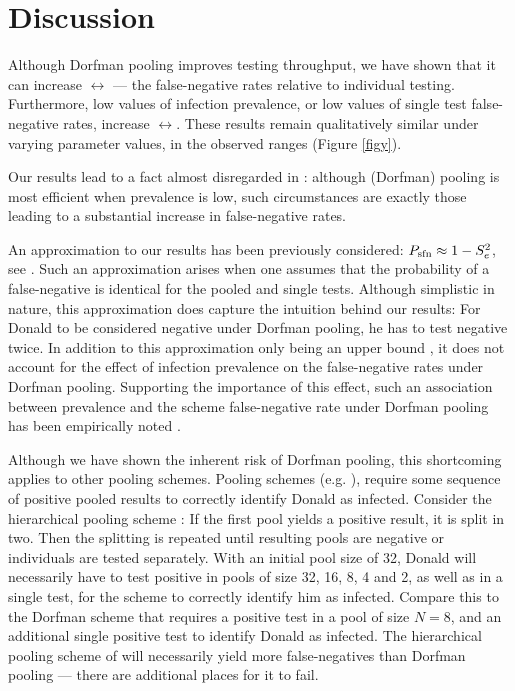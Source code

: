 \documentclass{article}
\begin{document}
\section{Discussion}
Although Dorfman pooling improves testing throughput, we have shown
that it can increase $\rel$ --- the false-negative rates relative to
individual testing. Furthermore, low values of infection prevalence,
or low values of single test false-negative rates, increase
$\rel$. These results remain qualitatively similar under varying
parameter values, in the observed ranges
\cite{KitComparison,EstimatingRatesKucrika, EstimatingRatesLourenco,
  InterpretingCOVID19Test} (Figure \ref{figy}).

Our results lead to a fact almost disregarded in
\cite{DorfmanYuvalDor}: although (Dorfman) pooling is most efficient
when prevalence is low, such circumstances are exactly those leading
to a substantial increase in false-negative rates.

An approximation to our results has been previously considered: $P_{\text{sfn}}
\approx 1-S_e^2 $, see \cite{Simplistic1, Simplistic2, Kim,
  OptimalDorfmanPool}. Such an approximation arises when one assumes
that the probability of a false-negative is identical for the pooled
and single tests. Although simplistic in nature, this approximation
does capture the intuition behind our results: For Donald to be
considered negative under Dorfman pooling, he has to test negative
twice. In addition to this approximation only being an upper bound
\cite{Simplistic2}, it does not account for the effect of infection
prevalence on the false-negative rates under Dorfman
pooling. Supporting the importance of this effect, such an association
between prevalence and the scheme false-negative rate under Dorfman
pooling has been empirically noted \cite{DorfmanYuvalDor}.

Although we have shown the inherent risk of Dorfman pooling, this
shortcoming applies to other pooling schemes. Pooling schemes
(e.g. \cite{MatrixPooling,Lion, Kim}), require some sequence of
positive pooled results to correctly identify Donald as
infected. Consider the hierarchical pooling scheme \cite{Lion, Kim}:
If the first pool yields a positive result, it is split in two. Then
the splitting is repeated until resulting pools are negative or
individuals are tested separately. With an initial pool size of 32,
Donald will necessarily have to test positive in pools of size 32, 16,
8, 4 and 2, as well as in a single test, for the scheme to correctly
identify him as infected. Compare this to the Dorfman scheme that
requires a positive test in a pool of size $N=8$, and an additional
single positive test to identify Donald as infected. The hierarchical
pooling scheme of \cite{Lion, Kim} will necessarily yield more
false-negatives than Dorfman pooling --- there are additional places
for it to fail.
\end{document}
